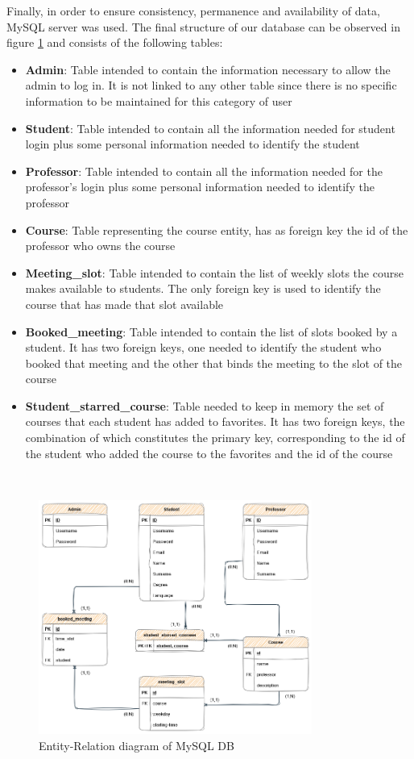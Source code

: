 Finally, in order to ensure consistency, permanence and availability of data, MySQL server was used.
The final structure of our database can be observed in figure \ref{fig:mysql_er} and consists of the following tables:
\begin{itemize}
    \item \textbf{Admin}: Table intended to contain the information necessary to allow the admin to log in. It is not linked to any other table since there is no specific information to be maintained for this category of user 
    \item \textbf{Student}: Table intended to contain all the information needed for student login plus some personal information needed to identify the student
    \item \textbf{Professor}: Table intended to contain all the information needed for the professor's login plus some personal information needed to identify the professor
    \item \textbf{Course}: Table representing the course entity, has as foreign key the id of the professor who owns the course
    \item \textbf{Meeting\_slot}: Table intended to contain the list of weekly slots the course makes available to students. The only foreign key is used to identify the course that has made that slot available
    \item \textbf{Booked\_meeting}: Table intended to contain the list of slots booked by a student. It has two foreign keys, one needed to identify the student who booked that meeting and the other that binds the meeting to the slot of the course
    \item \textbf{Student\_starred\_course}: Table needed to keep in memory the set of courses that each student has added to favorites. It has two foreign keys, the combination of which constitutes the primary key, corresponding to the id of the student who added the course to the favorites and the id of the course 
\end{itemize}
\ \\
\begin{figure}[ht]
	\centering
	\includegraphics[width=0.8\textwidth]{img/mysql/er.png}
	\caption{Entity-Relation diagram of MySQL DB}
	\label{fig:mysql_er}
\end{figure}